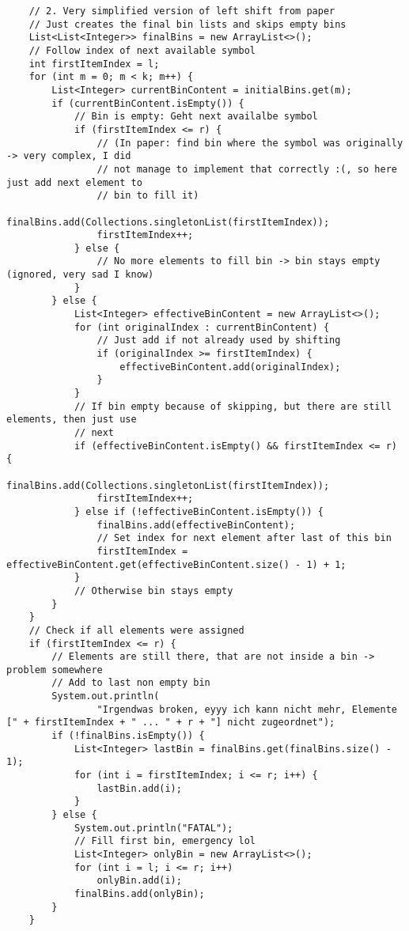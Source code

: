 \documentclass[a4paper,10pt,ngerman]{scrartcl}
\begin{document}
\begin{lstlisting}
    // 2. Very simplified version of left shift from paper
    // Just creates the final bin lists and skips empty bins
    List<List<Integer>> finalBins = new ArrayList<>();
    // Follow index of next available symbol
    int firstItemIndex = l;
    for (int m = 0; m < k; m++) {
        List<Integer> currentBinContent = initialBins.get(m);
        if (currentBinContent.isEmpty()) {
            // Bin is empty: Geht next availalbe symbol
            if (firstItemIndex <= r) {
                // (In paper: find bin where the symbol was originally -> very complex, I did
                // not manage to implement that correctly :(, so here just add next element to
                // bin to fill it)
                finalBins.add(Collections.singletonList(firstItemIndex));
                firstItemIndex++;
            } else {
                // No more elements to fill bin -> bin stays empty (ignored, very sad I know)
            }
        } else {
            List<Integer> effectiveBinContent = new ArrayList<>();
            for (int originalIndex : currentBinContent) {
                // Just add if not already used by shifting
                if (originalIndex >= firstItemIndex) {
                    effectiveBinContent.add(originalIndex);
                }
            }
            // If bin empty because of skipping, but there are still elements, then just use
            // next
            if (effectiveBinContent.isEmpty() && firstItemIndex <= r) {
                finalBins.add(Collections.singletonList(firstItemIndex));
                firstItemIndex++;
            } else if (!effectiveBinContent.isEmpty()) {
                finalBins.add(effectiveBinContent);
                // Set index for next element after last of this bin
                firstItemIndex = effectiveBinContent.get(effectiveBinContent.size() - 1) + 1;
            }
            // Otherwise bin stays empty
        }
    }
    // Check if all elements were assigned
    if (firstItemIndex <= r) {
        // Elements are still there, that are not inside a bin -> problem somewhere
        // Add to last non empty bin
        System.out.println(
                "Irgendwas broken, eyyy ich kann nicht mehr, Elemente [" + firstItemIndex + " ... " + r + "] nicht zugeordnet");
        if (!finalBins.isEmpty()) {
            List<Integer> lastBin = finalBins.get(finalBins.size() - 1);
            for (int i = firstItemIndex; i <= r; i++) {
                lastBin.add(i);
            }
        } else {
            System.out.println("FATAL");
            // Fill first bin, emergency lol
            List<Integer> onlyBin = new ArrayList<>();
            for (int i = l; i <= r; i++)
                onlyBin.add(i);
            finalBins.add(onlyBin);
        }
    }


\end{lstlisting}
\end{document}
